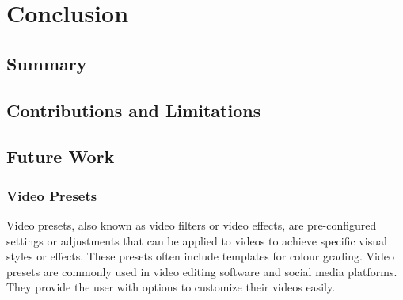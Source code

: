 \documentclass[../MasterThesis.tex]{subfiles}
\begin{document}
	
	
%
%
%
%
%
%
%
%
\newpage
\section{Conclusion} \label{section:conclusion}


\subsection{Summary} \label{subsection:summary}


\subsection{Contributions and Limitations} \label{subsection:contributionsandlimitations}


\subsection{Future Work} \label{subsection:futurework}

\subsubsection*{Video Presets}

Video presets, also known as video filters or video effects, are pre-configured settings or adjustments that can be applied to videos to achieve specific visual styles or effects. 
These presets often include templates for colour grading. 
Video presets are commonly used in video editing software and social media platforms. They provide the user with options to customize their videos easily. 
\end{document}

